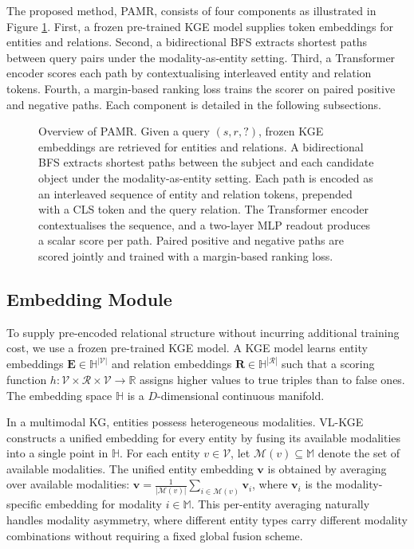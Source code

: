 \documentclass[runningheads]{llncs}
\begin{document}
The proposed method, PAMR, consists of four components as illustrated in Figure \ref{fig:overview}. First, a frozen
pre-trained KGE model supplies token embeddings for entities and relations.
Second, a bidirectional BFS extracts shortest paths between query pairs under the modality-as-entity setting.
Third, a Transformer encoder scores each path by contextualising
interleaved entity and relation tokens. Fourth, a margin-based ranking
loss trains the scorer on paired positive and negative paths. Each
component is detailed in the following subsections.

\begin{figure}[t]
  \centering
  
  \caption{Overview of PAMR. Given a query $(s, r, ?)$, frozen KGE embeddings are retrieved for entities and relations. A bidirectional BFS extracts shortest paths between the subject and each candidate object under the modality-as-entity setting. Each path is encoded as an interleaved sequence of entity and relation tokens, prepended with a CLS token and the query relation. The Transformer encoder contextualises the sequence, and a two-layer MLP readout produces a scalar score per path. Paired positive and negative paths are scored jointly and trained with a margin-based ranking loss.}
  \label{fig:overview}
\end{figure}

\subsection{Embedding Module}
\label{sec:embedding-module}

To supply pre-encoded relational structure without incurring additional
training cost, we use a frozen pre-trained KGE model.  A KGE model
learns entity embeddings $\mathbf{E} \in \mathbb{H}^{|\mathcal{V}|}$
and relation embeddings $\mathbf{R} \in \mathbb{H}^{|\mathcal{R}|}$
such that a scoring function $h: \mathcal{V} \times \mathcal{R} \times
\mathcal{V} \to \mathbb{R}$ assigns higher values to true triples
than to false ones.  The embedding space $\mathbb{H}$ is a
$D$-dimensional continuous manifold.

In a multimodal KG, entities possess heterogeneous modalities.
VL-KGE~\cite{efthymiou2026vlkge} constructs a unified embedding for
every entity by fusing its available modalities into a single point
in $\mathbb{H}$.  For each entity $v \in \mathcal{V}$, let
$\mathcal{M}(v) \subseteq \mathbb{M}$ denote the set of available
modalities.  The unified entity embedding $\mathbf{v}$ is obtained
by averaging over available modalities:
$\mathbf{v} = \frac{1}{|\mathcal{M}(v)|} \sum_{i \in \mathcal{M}(v)} \mathbf{v}_i$,
where $\mathbf{v}_i$ is the modality-specific embedding for modality
$i \in \mathbb{M}$.  This per-entity averaging naturally handles
modality asymmetry, where different entity types carry different
modality combinations without requiring a fixed global fusion scheme.
\end{document}
